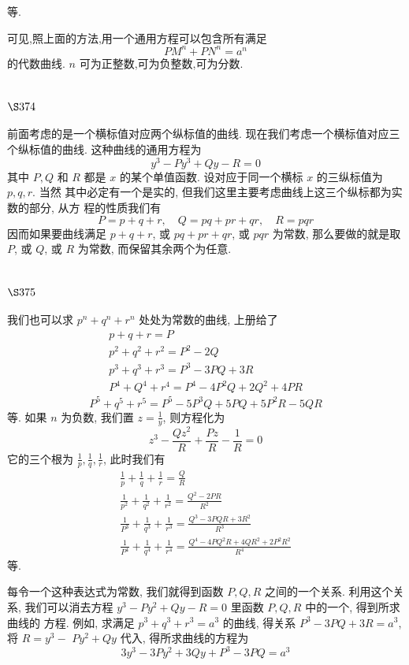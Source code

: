 等.

可见,照上面的方法,用一个通用方程可以包含所有满足
\[
P M^{n}+P N^{n}=a^{n}
\]
的代数曲线. $n$ 可为正整数,可为负整数,可为分数.

\section{$\S 374$}

前面考虑的是一个横标值对应两个纵标值的曲线. 现在我们考虑一个横标值对应三 个纵标值的曲线. 这种曲线的通用方程为
\[
y^{3}-P y^{3}+Q y-R=0
\]
其中 $P, Q$ 和 $R$ 都是 $x$ 的某个单值函数. 设对应于同一个横标 $x$ 的三纵标值为 $p, q, r$. 当然 其中必定有一个是实的, 但我们这里主要考虑曲线上这三个纵标都为实数的部分, 从方 程的性质我们有
\[
P=p+q+r, \quad Q=p q+p r+q r, \quad R=p q r
\]
因而如果要曲线满足 $p+q+r$, 或 $p q+p r+q r$, 或 $p q r$ 为常数, 那么要做的就是取 $P$, 或 $Q$, 或 $R$ 为常数, 而保留其余两个为任意.

\section{$\S 375$}

我们也可以求 $p^{n}+q^{n}+r^{n}$ 处处为常数的曲线, 上册给了
\[
\begin{gathered}
p+q+r=P \\
p^{2}+q^{2}+r^{2}=P^{2}-2 Q \\
p^{3}+q^{3}+r^{3}=P^{3}-3 P Q+3 R \\
P^{4}+Q^{4}+r^{4}=P^{4}-4 P^{2} Q+2 Q^{2}+4 P R
\end{gathered}
\]
\[
P^{5}+q^{5}+r^{5}=P^{5}-5 P^{3} Q+5 P Q+5 P^{2} R-5 Q R
\]
等. 如果 $n$ 为负数, 我们置 $z=\frac{1}{y}$, 则方程化为
\[
z^{3}-\frac{Q z^{2}}{R}+\frac{P z}{R}-\frac{1}{R}=0
\]
它的三个根为 $\frac{1}{p}, \frac{1}{q}, \frac{1}{r}$, 此时我们有
\[
\begin{gathered}
\frac{1}{p}+\frac{1}{q}+\frac{1}{r}=\frac{Q}{R} \\
\frac{1}{p^{2}}+\frac{1}{q^{2}}+\frac{1}{r^{2}}=\frac{Q^{2}-2 P R}{R^{2}} \\
\frac{1}{P^{3}}+\frac{1}{q^{3}}+\frac{1}{r^{3}}=\frac{Q^{3}-3 P Q R+3 R^{2}}{R^{3}} \\
\frac{1}{P^{4}}+\frac{1}{q^{4}}+\frac{1}{r^{4}}=\frac{Q^{4}-4 P Q^{2} R+4 Q R^{2}+2 P^{2} R^{2}}{R^{4}}
\end{gathered}
\]
等.

每令一个这种表达式为常数, 我们就得到函数 $P, Q, R$ 之间的一个关系. 利用这个关 系, 我们可以消去方程 $y^{3}-P y^{2}+Q y-R=0$ 里函数 $P, Q, R$ 中的一个, 得到所求曲线的 方程. 例如, 求满足 $p^{3}+q^{3}+r^{3}=a^{3}$ 的曲线, 得关系 $P^{3}-3 P Q+3 R=a^{3}$, 将 $R=y^{3}-$ $P y^{2}+Q y$ 代入, 得所求曲线的方程为
\[
3 y^{3}-3 P y^{2}+3 Q y+P^{3}-3 P Q=a^{3}
\]
